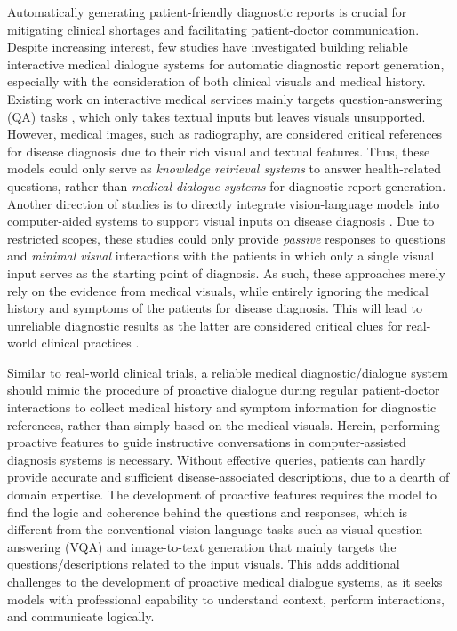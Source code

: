Automatically generating patient-friendly diagnostic reports is crucial for mitigating clinical shortages and facilitating patient-doctor communication. Despite increasing interest, few studies have investigated building reliable interactive medical dialogue systems for automatic diagnostic report generation, especially with the consideration of both clinical visuals and medical history. Existing work on interactive medical services mainly targets question-answering (QA) tasks \cite{srivastava2020automatized,singhal2023towards,singhal2023large,chen2023meditron}, which only takes textual inputs but leaves visuals unsupported. However, medical images, such as radiography, are considered critical references for disease diagnosis due to their rich visual and textual features. Thus, these models could only serve as \textit{knowledge retrieval systems} to answer health-related questions, rather than \textit{medical dialogue systems} for diagnostic report generation. Another direction of studies is to directly integrate vision-language models into computer-aided systems to support visual inputs on disease diagnosis \cite{zhao2023chatcad+,zhou2023skingpt4,zhu2023minigpt4,chen-etal-2021-cross-modal}. Due to restricted scopes, these studies could only provide \textit{passive} responses to questions and \textit{minimal visual} interactions with the patients in which only a single visual input serves as the starting point of diagnosis. As such, these approaches merely rely on the evidence from medical visuals, while entirely ignoring the medical history and symptoms of the patients for disease diagnosis. This will lead to unreliable diagnostic results as the latter are considered critical clues for real-world clinical practices \cite{fukuzawa2024importance, sandler1980importance}. 

Similar to real-world clinical trials, a reliable medical diagnostic/dialogue system should mimic the procedure of proactive dialogue during regular patient-doctor interactions to collect medical history and symptom information for diagnostic references, rather than simply based on the medical visuals. Herein, performing proactive features to guide instructive conversations in computer-assisted diagnosis systems is necessary. Without effective queries, patients can hardly provide accurate and sufficient disease-associated descriptions, due to a dearth of domain expertise. The development of proactive features requires the model to find the logic and coherence behind the questions and responses, which is different from the conventional vision-language tasks such as visual question answering (VQA) and image-to-text generation \cite{antol2015vqa, wu2022medical, goyal2017making,tewel2022zerocap, ben2019vqa} that mainly targets the questions/descriptions related to the input visuals. This adds additional challenges to the development of proactive medical dialogue systems, as it seeks models with professional capability to understand context, perform interactions, and communicate logically.

